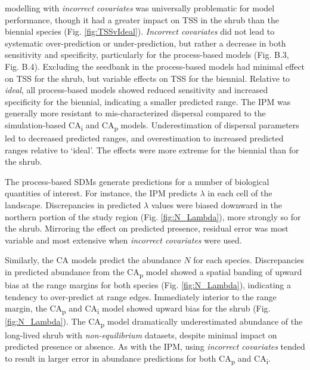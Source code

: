 \documentclass[preprint,review,times,12pt]{elsarticle}
\begin{document}
modelling with \emph{incorrect covariates} was universally problematic for model performance, though it had a greater impact on TSS in the shrub than the biennial species (Fig. \ref{fig:TSSvIdeal}). \emph{Incorrect covariates} did not lead to systematic over-prediction or under-prediction, but rather a decrease in both sensitivity and specificity, particularly for the process-based models (Fig. B.3, Fig. B.4). Excluding the seedbank in the process-based models had minimal effect on TSS for the shrub, but variable effects on TSS for the biennial. Relative to \emph{ideal}, all process-based models showed reduced sensitivity and increased specificity for the biennial, indicating a smaller predicted range. The IPM was generally more resistant to mis-characterized dispersal compared to the simulation-based CA\textsubscript{i} and CA\textsubscript{p} models. Underestimation of dispersal parameters led to decreased predicted ranges, and overestimation to increased predicted ranges relative to ‘ideal’. The effects were more extreme for the biennial than for the shrub.

The process-based SDMs generate predictions for a number of biological quantities of interest. For instance, the IPM predicts $\lambda$ in each cell of the landscape. Discrepancies in predicted $\lambda$ values were biased downward in the northern portion of the study region (Fig. \ref{fig:N_Lambda}), more strongly so for the shrub. Mirroring the effect on predicted presence, residual error was most variable and most extensive when \emph{incorrect covariates} were used. 

Similarly, the CA models predict the abundance $N$ for each species. Discrepancies in predicted abundance from the CA\textsubscript{p} model showed a spatial banding of upward bias at the range margins for both species (Fig. \ref{fig:N_Lambda}), indicating a tendency to over-predict at range edges. Immediately interior to the range margin, the CA\textsubscript{p} and CA\textsubscript{i} model showed upward bias for the shrub (Fig. \ref{fig:N_Lambda}). The CA\textsubscript{p} model dramatically underestimated abundance of the long-lived shrub with \emph{non-equilibrium} datasets, despite minimal impact on predicted presence or absence. As with the IPM, using \emph{incorrect covariates} tended to result in larger error in abundance predictions for both CA\textsubscript{p} and CA\textsubscript{i}.
\end{document}
